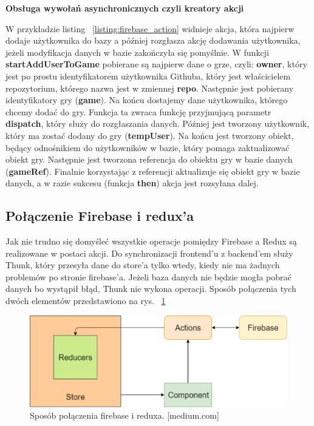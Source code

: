 \newpage

\begin{center}
	\textbf{Obsługa wywołań asynchronicznych czyli kreatory akcji}
\end{center}

W przykładzie listing
~\ref{listing:firebase_action} widnieje akcja,
która najpierw dodaje użytkownika do bazy a później rozgłasza akcję dodawania użytkownika,
jeżeli modyfikacja danych w bazie zakończyła się pomyślnie.
W funkcji \textbf{startAddUserToGame} pobierane są najpierw dane o grze, czyli: \textbf{owner},
który jest po prostu identyfikatorem użytkownika Githuba,
który jest właścicielem repozytorium, którego nazwa jest w zmiennej \textbf{repo}.
Następnie jest pobierany identyfikatory gry (\textbf{game}).
Na końcu dostajemy dane użytkownika, którego chcemy dodać do gry.
Funkcja ta zwraca funkcję przyjmującą parametr \textbf{dispatch},
który służy do rozgłaszania danych.
Później jest tworzony użytkownik, który ma zostać dodany do gry (\textbf{tempUser}).
Na końcu jest tworzony obiekt, będący odnośnikiem do użytkowników w bazie,
który pomaga zaktualizować obiekt gry.
Następnie jest tworzona referencja do obiektu gry w bazie danych (\textbf{gameRef}).
Finalnie korzystając z referencji aktualizuje się obiekt gry w bazie danych,
 a w razie sukcesu (funkcja \textbf{then}) akcja jest rozsyłana dalej.

\subsection{Połączenie Firebase i redux’a}

Jak nie trudno się domyśleć wszystkie operacje pomiędzy Firebase a Redux są realizowane w postaci akcji.
Do synchronizacji frontend’u z backend’em służy Thunk,
który przesyła dane do store’a tylko wtedy,
kiedy nie ma żadnych problemów po stronie firebase’a.
Jeżeli baza danych nie będzie mogła pobrać danych bo wystąpił błąd,
Thunk nie wykona operacji. Sposób połączenia tych dwóch elementów przedstawiono na rys.
~\ref{rys:fireRedux}

\begin{figure}
	\centering\includegraphics[width=.6\textwidth]{img/fireRedux}
	\caption{Sposób połączenia firebase i reduxa. [medium.com]}\label{rys:fireRedux}%
\end{figure}
